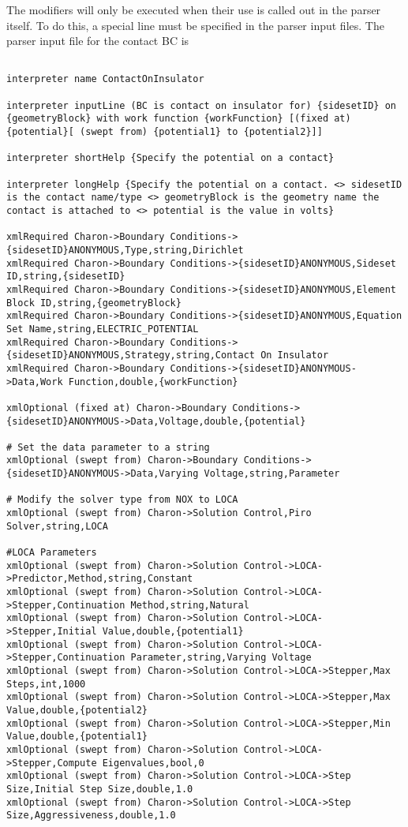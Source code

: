 The modifiers will only be executed when their use is called out in
the parser itself.  To do this, a special line must be specified in
the parser input files.  The parser input file for the contact BC is
\begin{lstlisting}

interpreter name ContactOnInsulator

interpreter inputLine (BC is contact on insulator for) {sidesetID} on {geometryBlock} with work function {workFunction} [(fixed at) {potential}[ (swept from) {potential1} to {potential2}]]

interpreter shortHelp {Specify the potential on a contact}

interpreter longHelp {Specify the potential on a contact. <> sidesetID is the contact name/type <> geometryBlock is the geometry name the contact is attached to <> potential is the value in volts}

xmlRequired Charon->Boundary Conditions->{sidesetID}ANONYMOUS,Type,string,Dirichlet
xmlRequired Charon->Boundary Conditions->{sidesetID}ANONYMOUS,Sideset ID,string,{sidesetID}
xmlRequired Charon->Boundary Conditions->{sidesetID}ANONYMOUS,Element Block ID,string,{geometryBlock}
xmlRequired Charon->Boundary Conditions->{sidesetID}ANONYMOUS,Equation Set Name,string,ELECTRIC_POTENTIAL
xmlRequired Charon->Boundary Conditions->{sidesetID}ANONYMOUS,Strategy,string,Contact On Insulator
xmlRequired Charon->Boundary Conditions->{sidesetID}ANONYMOUS->Data,Work Function,double,{workFunction}

xmlOptional (fixed at) Charon->Boundary Conditions->{sidesetID}ANONYMOUS->Data,Voltage,double,{potential}

# Set the data parameter to a string
xmlOptional (swept from) Charon->Boundary Conditions->{sidesetID}ANONYMOUS->Data,Varying Voltage,string,Parameter

# Modify the solver type from NOX to LOCA
xmlOptional (swept from) Charon->Solution Control,Piro Solver,string,LOCA

#LOCA Parameters
xmlOptional (swept from) Charon->Solution Control->LOCA->Predictor,Method,string,Constant
xmlOptional (swept from) Charon->Solution Control->LOCA->Stepper,Continuation Method,string,Natural
xmlOptional (swept from) Charon->Solution Control->LOCA->Stepper,Initial Value,double,{potential1}
xmlOptional (swept from) Charon->Solution Control->LOCA->Stepper,Continuation Parameter,string,Varying Voltage
xmlOptional (swept from) Charon->Solution Control->LOCA->Stepper,Max Steps,int,1000
xmlOptional (swept from) Charon->Solution Control->LOCA->Stepper,Max Value,double,{potential2}
xmlOptional (swept from) Charon->Solution Control->LOCA->Stepper,Min Value,double,{potential1}
xmlOptional (swept from) Charon->Solution Control->LOCA->Stepper,Compute Eigenvalues,bool,0
xmlOptional (swept from) Charon->Solution Control->LOCA->Step Size,Initial Step Size,double,1.0
xmlOptional (swept from) Charon->Solution Control->LOCA->Step Size,Aggressiveness,double,1.0


\end{lstlisting}
